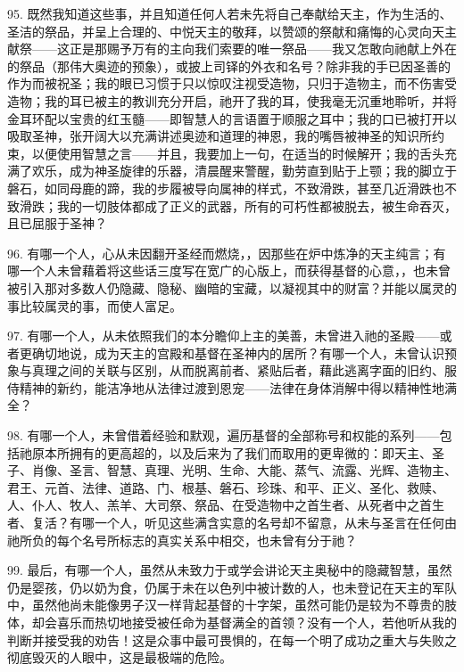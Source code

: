 95. 既然我知道这些事，并且知道任何人若未先将自己奉献给天主，作为生活的、圣洁的祭品，并呈上合理的、中悦天主的敬拜，以赞颂的祭献和痛悔的心灵向天主献祭——这正是那赐予万有的主向我们索要的唯一祭品——我又怎敢向祂献上外在的祭品（那伟大奥迹的预象），或披上司铎的外衣和名号？除非我的手已因圣善的作为而被祝圣；我的眼已习惯于只以惊叹注视受造物，只归于造物主，而不伤害受造物；我的耳已被主的教训充分开启，祂开了我的耳，使我毫无沉重地聆听，并将金耳环配以宝贵的红玉髓——即智慧人的言语置于顺服之耳中；我的口已被打开以吸取圣神，张开阔大以充满讲述奥迹和道理的神恩，我的嘴唇被神圣的知识所约束，以便使用智慧之言——并且，我要加上一句，在适当的时候解开；我的舌头充满了欢乐，成为神圣旋律的乐器，清晨醒来警醒，勤劳直到贴于上颚；我的脚立于磐石，如同母鹿的蹄，我的步履被导向属神的样式，不致滑跌，甚至几近滑跌也不致滑跌；我的一切肢体都成了正义的武器，所有的可朽性都被脱去，被生命吞灭，且已屈服于圣神？\par

96. 有哪一个人，心从未因翻开圣经而燃烧，，因那些在炉中炼净的天主纯言；有哪一个人未曾藉着将这些话三度写在宽广的心版上，而获得基督的心意，，也未曾被引入那对多数人仍隐藏、隐秘、幽暗的宝藏，以凝视其中的财富？并能以属灵的事比较属灵的事，而使人富足。\par

97. 有哪一个人，从未依照我们的本分瞻仰上主的美善，未曾进入祂的圣殿——或者更确切地说，成为天主的宫殿和基督在圣神内的居所？有哪一个人，未曾认识预象与真理之间的关联与区别，从而脱离前者、紧贴后者，藉此逃离字面的旧约、服侍精神的新约，能洁净地从法律过渡到恩宠——法律在身体消解中得以精神性地满全？\par

98. 有哪一个人，未曾借着经验和默观，遍历基督的全部称号和权能的系列——包括祂原本所拥有的更高超的，以及后来为了我们而取用的更卑微的：即天主、圣子、肖像、圣言、智慧、真理、光明、生命、大能、蒸气、流露、光辉、造物主、君王、元首、法律、道路、门、根基、磐石、珍珠、和平、正义、圣化、救赎、人、仆人、牧人、羔羊、大司祭、祭品、在受造物中之首生者、从死者中之首生者、复活？有哪一个人，听见这些满含实意的名号却不留意，从未与圣言在任何由祂所负的每个名号所标志的真实关系中相交，也未曾有分于祂？\par

99. 最后，有哪一个人，虽然从未致力于或学会讲论天主奥秘中的隐藏智慧，虽然仍是婴孩，仍以奶为食，仍属于未在以色列中被计数的人，也未登记在天主的军队中，虽然他尚未能像男子汉一样背起基督的十字架，虽然可能仍是较为不尊贵的肢体，却会喜乐而热切地接受被任命为基督满全的首领？没有一个人，若他听从我的判断并接受我的劝告！这是众事中最可畏惧的，在每一个明了成功之重大与失败之彻底毁灭的人眼中，这是最极端的危险。\par

